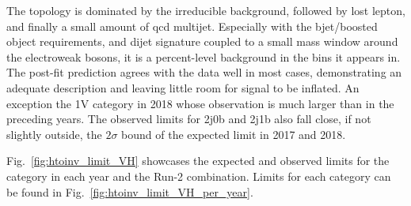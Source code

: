 The \VH topology is dominated by the irreducible \ztonunupjets background, followed by lost lepton, and finally a small amount of \acrshort{qcd} multijet. Especially with the \gls{bjet}/boosted object requirements, and dijet signature coupled to a small mass window around the electroweak bosons, it is a percent-level background in the bins it appears in. The post-fit prediction agrees with the data well in most cases, demonstrating an adequate description and leaving little room for signal to be inflated. An exception the 1V category in 2018 whose observation is much larger than in the preceding years. The observed limits for 2j0b and 2j1b also fall close, if not slightly outside, the $\text{2}\sigma$ bound of the expected limit in 2017 and 2018.

Fig.~\ref{fig:htoinv_limit_VH} showcases the expected and observed limits for the \VH category in each year and the Run-2 combination. Limits for each category can be found in Fig.~\ref{fig:htoinv_limit_VH_per_year}.

